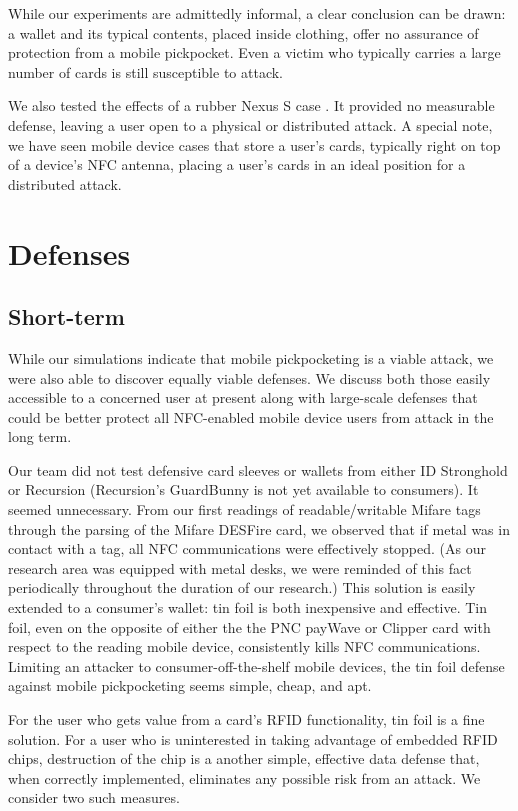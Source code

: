 \documentclass{IEEEtran}
\begin{document}
While our experiments are admittedly informal, a clear conclusion can be drawn:  a wallet and its typical contents, placed inside clothing, offer no assurance of protection from a mobile pickpocket.  Even a victim who typically carries a large number of cards is still susceptible to attack.

We also tested the effects of a rubber Nexus S case \cite{ebay-epik-nexus-s-case}.  It provided no measurable defense, leaving a user open to a physical or distributed attack.  A special note, we have seen mobile device cases  \cite{ebay-fluffy-nexus-s-case} that store a user's cards, typically right on top of a device's NFC antenna, placing a user's cards in an ideal position for a distributed attack.

\section{Defenses}
\subsection{Short-term}
While our simulations indicate that mobile pickpocketing is a viable attack, we were also able to discover equally viable defenses.  We discuss both those easily accessible to a concerned user at present along with large-scale defenses that could be better protect all NFC-enabled mobile device users from attack in the long term.

Our team did not test defensive card sleeves or wallets from either ID Stronghold or Recursion (Recursion's GuardBunny is not yet available to consumers).  It seemed unnecessary.  From our first readings of readable/writable Mifare tags through the parsing of the Mifare DESFire card, we observed that if metal was in contact with a tag, all NFC communications were effectively stopped.  (As our research area was equipped with metal desks, we were reminded of this fact periodically throughout the duration of our research.)  This solution is easily extended to a consumer's wallet: tin foil is both inexpensive and effective.  Tin foil, even on the opposite of either the the PNC payWave or Clipper card with respect to the reading mobile device, consistently kills NFC communications. Limiting an attacker to consumer-off-the-shelf mobile devices, the tin foil defense against mobile pickpocketing seems simple, cheap, and apt.

For the user who gets value from a card's RFID functionality, tin foil is a fine solution.  For a user who is uninterested in taking advantage of embedded RFID chips, destruction of the chip is a another simple, effective data defense that, when correctly implemented, eliminates any possible risk from an attack.  We consider two such measures.
\end{document}
